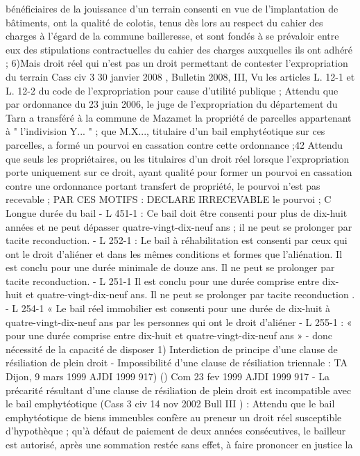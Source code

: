 \documentclass[11pt,a4paper]{report}
\begin{document}
	bénéficiaires de la jouissance d'un terrain consenti en vue de l'implantation de bâtiments, ont la qualité de
	colotis, tenus dès lors au respect du cahier des charges à l'égard de la commune bailleresse, et sont fondés à se
	prévaloir entre eux des stipulations contractuelles du cahier des charges auxquelles ils ont adhéré ;
	6)Mais droit réel qui n’est pas un droit permettant de contester l’expropriation du terrain
	Cass civ 3 30 janvier 2008 , Bulletin 2008, III, 
	Vu les articles L. 12-1 et L. 12-2 du code de l'expropriation pour cause d'utilité publique ;
	Attendu que par ordonnance du 23 juin 2006, le juge de l'expropriation du département du Tarn a transféré à la
	commune de Mazamet la propriété de parcelles appartenant à " l'indivision Y... " ; que M.X..., titulaire d'un bail
	emphytéotique sur ces parcelles, a formé un pourvoi en cassation contre cette ordonnance ;42
	Attendu que seuls les propriétaires, ou les titulaires d'un droit réel lorsque l'expropriation porte uniquement sur
	ce droit, ayant qualité pour former un pourvoi en cassation contre une ordonnance portant transfert de
	propriété, le pourvoi n'est pas recevable ;
	PAR CES MOTIFS : DECLARE IRRECEVABLE le pourvoi ;
	C Longue durée du bail
	- L 451-1 : Ce bail doit être consenti pour plus de dix-huit années et ne peut dépasser quatre-vingt-dix-neuf
	ans ; il ne peut se prolonger par tacite reconduction.
	- L 252-1 : Le bail à réhabilitation est consenti par ceux qui ont le droit d'aliéner et dans les mêmes conditions
	et formes que l'aliénation. Il est conclu pour une durée minimale de douze ans. Il ne peut se prolonger par tacite
	reconduction.
	- L 251-1 Il est conclu pour une durée comprise entre dix-huit et quatre-vingt-dix-neuf ans. Il ne peut se
	prolonger par tacite reconduction .
	- L 254-1 « Le bail réel immobilier est consenti pour une durée de dix-huit à quatre-vingt-dix-neuf ans par les
	personnes qui ont le droit d'aliéner
	- L 255-1 : « pour une durée comprise entre dix-huit et quatre-vingt-dix-neuf ans »
	- donc nécessité de la capacité de disposer
	1) Interdiction de principe d’une clause de résiliation de plein droit
	- Impossibilité d’une clause de résiliation triennale : TA Dijon, 9 mars 1999 AJDI 1999 917) () Com 23 fev
	1999 AJDI 1999 917
	- La précarité résultant d’une clause de résiliation de plein droit est incompatible avec le bail
	emphytéotique (Cass 3 civ 14 nov 2002 Bull III ) : Attendu que le bail emphytéotique de biens immeubles
	confère au preneur un droit réel susceptible d'hypothèque ; qu'à défaut de paiement de deux années
	consécutives, le bailleur est autorisé, après une sommation restée sans effet, à faire prononcer en justice la
\end{document}
